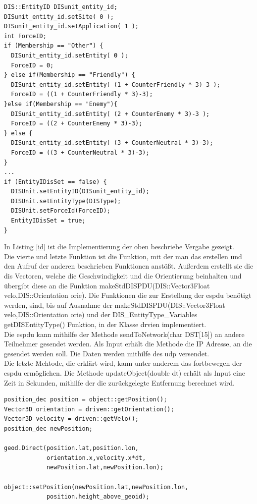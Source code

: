 \begin{lstlisting}[caption = EntityID und ForceID ,label= id]
DIS::EntityID DISunit_entity_id;
DISunit_entity_id.setSite( 0 );
DISunit_entity_id.setApplication( 1 );
int ForceID;
if (Membership == "Other") {
  DISunit_entity_id.setEntity( 0 );
  ForceID = 0;
} else if(Membership == "Friendly") {
  DISunit_entity_id.setEntity( (1 + CounterFriendly * 3)-3 );
  ForceID = ((1 + CounterFriendly * 3)-3);
}else if(Membership == "Enemy"){
  DISunit_entity_id.setEntity( (2 + CounterEnemy * 3)-3 );
  ForceID = ((2 + CounterEnemy * 3)-3);
} else {
  DISunit_entity_id.setEntity( (3 + CounterNeutral * 3)-3);
  ForceID = ((3 + CounterNeutral * 3)-3);
}
...
if (EntityIDisSet == false) {
  DISUnit.setEntityID(DISunit_entity_id);
  DISUnit.setEntityType(DISType);
  DISUnit.setForceId(ForceID);
  EntityIDisSet = true;
}
\end{lstlisting}
In Listing \ref{id} ist die Implementierung der oben beschriebe Vergabe gezeigt.
\\
Die vierte und letzte Funktion ist die Funktion, mit der man das erstellen und den Aufruf der anderen beschrieben Funktionen anstößt. Außerdem erstellt sie die \ac{dis} Vectoren, welche die Geschwindigkeit und die Orientierung beinhalten und übergibt diese an die Funktion \glqq makeStdDISPDU(DIS::Vector3Float velo,DIS::Orientation orie)\grqq{}. 
Die Funktionen die zur Erstellung der \ac{espdu} benötigt werden, sind, bis auf Ausnahme der \glqq makeStdDISPDU(DIS::Vector3Float velo,DIS::Orientation orie)\grqq{} und der \glqq DIS\_EntityType\_Variables getDISEntityType()\grqq{} Funktion, in der Klasse \glqq drvien \grqq{} implementiert. \\
Die \ac{espdu} kann mithilfe der Methode \glqq sendToNetwork(char DST[15]) \grqq{} an andere Teilnehmer gesendet werden. Als Input erhält die Methode die IP Adresse, an die gesendet werden soll. Die Daten werden mithilfe des \ac{udp} versendet.\\
Die letzte Mehtode, die erklärt wird, kann unter anderem das fortbewegen der \ac{espdu} ermöglichen. 
Die Methode \glqq updateObject(double dt) \grqq{} erhält als Input eine Zeit in Sekunden, mithilfe der die zurückgelegte Entfernung berechnet wird. 
 \begin{lstlisting}[caption = Update Funktion ,label= update]
position_dec position = object::getPosition();
Vector3D orientation = driven::getOrientation();
Vector3D velocity = driven::getVelo();
position_dec newPosition;

geod.Direct(position.lat,position.lon,
            orientation.x,velocity.x*dt,
            newPosition.lat,newPosition.lon);

object::setPosition(newPosition.lat,newPosition.lon,
		    position.height_above_geoid);
 \end{lstlisting}
